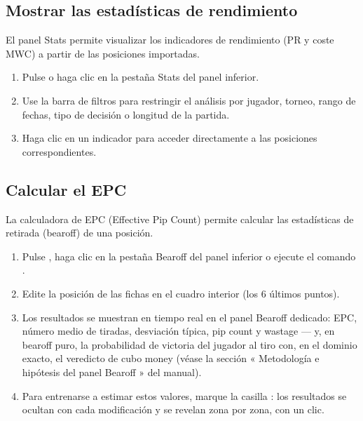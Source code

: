 \documentclass[letterpaper,10pt,spanish]{sphinxmanual}
\begin{document}
\subsection{Mostrar las estadísticas de rendimiento}
\label{\detokenize{guide_utilisateur:afficher-les-statistiques-de-performance}}
\sphinxAtStartPar
El panel Stats permite visualizar los indicadores de rendimiento (PR y coste MWC) a partir de las posiciones importadas.
\begin{enumerate}
%
\item {} 
\sphinxAtStartPar
Pulse  o haga clic en la pestaña Stats del panel inferior.

\item {} 
\sphinxAtStartPar
Use la barra de filtros para restringir el análisis por jugador, torneo, rango de fechas, tipo de decisión o longitud de la partida.

\item {} 
\sphinxAtStartPar
Haga clic en un indicador para acceder directamente a las posiciones correspondientes.

\end{enumerate}


\subsection{Calcular el EPC}
\label{\detokenize{guide_utilisateur:calculer-l-epc}}
\sphinxAtStartPar
La calculadora de EPC (Effective Pip Count) permite calcular las estadísticas de retirada (bearoff) de una posición.
\begin{enumerate}
%
\item {} 
\sphinxAtStartPar
Pulse , haga clic en la pestaña Bearoff del panel inferior o ejecute el comando .

\item {} 
\sphinxAtStartPar
Edite la posición de las fichas en el cuadro interior (los 6 últimos puntos).

\item {} 
\sphinxAtStartPar
Los resultados se muestran en tiempo real en el panel Bearoff dedicado: EPC, número medio de tiradas, desviación típica, pip count y wastage — y, en bearoff puro, la probabilidad de victoria del jugador al tiro con, en el dominio exacto, el veredicto de cubo money (véase la sección « Metodología e hipótesis del panel Bearoff » del manual).

\item {} 
\sphinxAtStartPar
Para entrenarse a estimar estos valores, marque la casilla : los resultados se ocultan con cada modificación y se revelan zona por zona, con un clic.

\end{enumerate}
\end{document}
